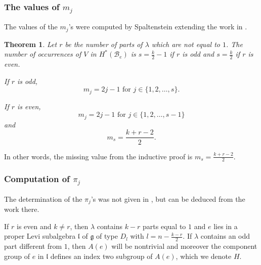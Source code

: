 \documentclass[10pt]{amsart}
\newcommand{\g}{\mathfrak{g}}
\newcommand{\levi}{\mathfrak l}
\newcommand{\flag}{{\mathcal B}}
\theoremstyle{plain}
\newtheorem{theorem}{Theorem}
\theoremstyle{definition}
\theoremstyle{remark}
\begin{document}
\subsubsection{\texorpdfstring{The values of $m_j$}{The values of fj}}

The values of the $m_j$'s were computed by Spaltenstein \cite{spaltenstein:reflection} extending the work in \cite{lehrer-shoji:reflections}.

\begin{theorem}\label{spalt:D}   \cite{spaltenstein:reflection} 
Let $r$ be the number of parts of $\lambda$ which are not equal to $1$.  The number of occurrences of $V$ in $H^*(\flag_e)$ is 
$s =  \frac{k}{2}-1$ if $r$ is odd and $s = \frac{k}{2}$ if $r$ is even.

If $r$ is odd,
$$m_j = 2j-1  \text{  for }  j \in \{1, 2, \dots, s\}.$$

If $r$ is even,
$$m_j = 2j-1 \text{  for } j \in \{1, 2, \dots, s-1\}$$
and 
$$m_s = {\frac{k + r - 2}{2}}.$$
\end{theorem}
%

In other words, the missing value from the inductive proof is $m_s = {\frac{k + r - 2}{2}}.$

\subsubsection{\texorpdfstring{Computation of $\pi_j$}{Computations of pij}}  \label{pis for D}
The determination of the $\pi_j$'s was not given in  \cite{spaltenstein:reflection}, but can be deduced from the work there.

If $r$ is even and $k \neq r$, then $\lambda$ contains $k-r$ parts equal to $1$ and 
$e$ lies in a proper Levi subalgebra $\levi$ of $\g$ of type $D_{l}$ with $l = n - \frac{k-r}{2}$.   
If $\lambda$ contains an odd part different from $1$, then $A(e)$ will be nontrivial and moreover 
the component group of $e$ in $\levi$ defines an index two subgroup of $A(e)$, which we denote $H$.
\end{document}
